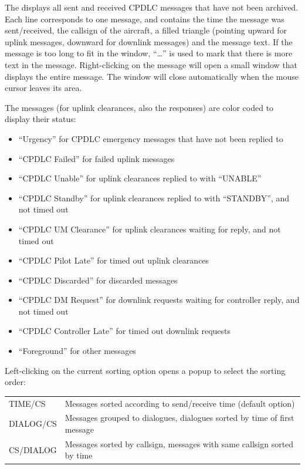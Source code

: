\documentclass[11pt,a4paper,oldfontcommands]{memoir}
\begin{document}
The \textit{} displays all sent and received CPDLC messages that have not been archived. Each line corresponds to one message, and contains the time the message was sent/received, the callsign of the aircraft, a filled triangle (pointing upward for uplink messages, downward for downlink messages) and the message text. If the message is too long to fit in the window, “…” is used to mark that there is more text in the message. Right-clicking on the message will open a small window that displays the entire message. The window will close automatically when the mouse cursor leaves its area.

The messages (for uplink clearances, also the responses) are color coded to display their status:

\begin{itemize}
    \item “Urgency” for CPDLC emergency messages that have not been replied to
    \item “CPDLC Failed” for failed uplink messages
    \item “CPDLC Unable” for uplink clearances replied to with “UNABLE”
    \item “CPDLC Standby” for uplink clearances replied to with “STANDBY”, and not timed out
    \item “CPDLC UM Clearance” for uplink clearances waiting for reply, and not timed out
    \item “CPDLC Pilot Late” for timed out uplink clearances
    \item “CPDLC Discarded” for discarded messages
    \item “CPDLC DM Request” for downlink requests waiting for controller reply, and not timed out
    \item “CPDLC Controller Late” for timed out downlink requests
    \item “Foreground” for other messages
\end{itemize}

Left-clicking on the current sorting option opens a popup to select the sorting order:

\begin{tabular}{l l}
    TIME/CS     & Messages sorted according to send/receive time (default option)\\
    DIALOG/CS   & Messages grouped to dialogues, dialogues sorted by time of first message\\
    CS/DIALOG   & Messages sorted by callsign, messages with same callsign sorted by time\\
\end{tabular}
\end{document}
